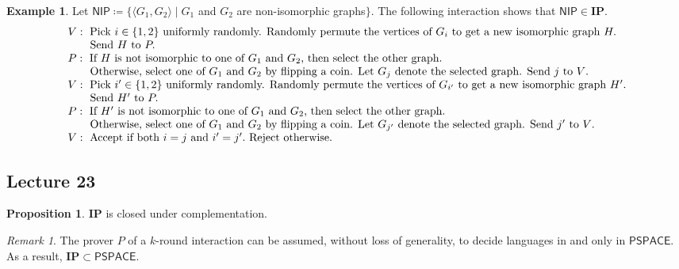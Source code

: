 \documentclass[10pt,letterpaper,cm]{nupset}
\theoremstyle{definition}
\newtheorem{exmp}[definition]{Example}
\theoremstyle{theorem}
\newtheorem{prop}[definition]{Proposition}
\theoremstyle{remark}
\newtheorem{remark}[definition]{Remark}
\newcommand{\1}{\mathbf{1}}
\newcommand{\0}{\vec 0}
\begin{document}
\begin{exmp}
Let $\mathsf{NIP}\coloneqq \{ \langle G_1, G_2 \rangle \mid G_1$ and $G_2$ are non-isomorphic graphs$\}$. The following interaction shows that $\mathsf{NIP} \in \mathbf{IP}$.
\[
\begin{array}{l}{V : \text { Pick } i \in\{1,2\} \text { uniformly randomly. Randomly permute the vertices of } G_{i} \text { to get a  new isomorphic graph } H .} \\ {\text {\quad \quad Send } H \text { to } P .} \\ {P : \text { If } H \text { is not isomorphic to one of } G_1 \text{ and } G_2 \text {, then select the other graph. }} \\ {
\text {\quad \quad Otherwise, select one of } G_1 \text{ and } G_2 \text { by flipping a coin. Let } G_j \text{ denote the selected graph. Send } j \text { to } V \text {. }} \\
{V : \text { Pick } i' \in\{1,2\} \text { uniformly randomly. Randomly permute the vertices of } G_{i'} \text { to get a new isomorphic graph } H' .} \\ { \text {\quad \quad Send } H' \text { to } P .} \\ {P : \text { If } H' \text { is not isomorphic to one of } G_1 \text{ and } G_2 \text {, then select the other graph. }} \\ {
\text {\quad \quad Otherwise, select one of } G_1 \text{ and } G_2 \text { by flipping a coin. Let } G_{j'} \text{ denote the selected graph. Send } j' \text { to } V \text {. }}
\\ {V : \text { Accept if both } i=j \text{ and } i' =j'. \text { Reject otherwise. }}\end{array}
\] 
\end{exmp}

\subsection{Lecture 23}

\begin{prop}
$\mathbf{IP}$ is closed under complementation. 
\end{prop}

\begin{remark}
The prover $P$ of a $k$-round interaction can be assumed, without loss of generality, to decide languages in and only in $\mathsf{PSPACE}$. As a result, $\mathbf{IP} \subset \mathsf{PSPACE}$.
\end{remark}
\end{document}
